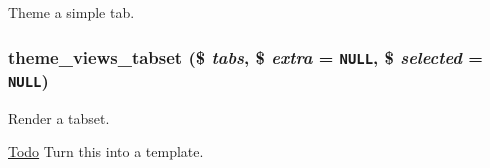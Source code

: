 Theme a simple tab. \hypertarget{tabs_8inc_205d52e785fc290ec3769378d2ee0ece}{
\subsubsection[{theme\_\-views\_\-tabset}]{\setlength{\rightskip}{0pt plus 5cm}theme\_\-views\_\-tabset (\$ {\em tabs}, \/  \$ {\em extra} = {\tt NULL}, \/  \$ {\em selected} = {\tt NULL})}}
\label{tabs_8inc_205d52e785fc290ec3769378d2ee0ece}


Render a tabset.

\begin{Desc}
\item[\hyperlink{todo__todo000009}{Todo}]Turn this into a template. \end{Desc}

